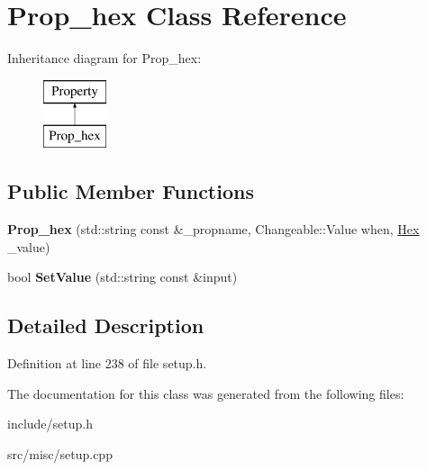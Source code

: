 \hypertarget{classProp__hex}{\section{Prop\-\_\-hex Class Reference}
\label{classProp__hex}
}
Inheritance diagram for Prop\-\_\-hex\-:\begin{figure}[H]
\begin{center}
\leavevmode
\includegraphics[height=2.000000cm]{classProp__hex}
\end{center}
\end{figure}
\subsection*{Public Member Functions}
\begin{DoxyCompactItemize}
\item 
\hypertarget{classProp__hex_a5a9df57c5efae0c495056cda181ccf40}{{\bfseries Prop\-\_\-hex} (std\-::string const \&\-\_\-propname, Changeable\-::\-Value when, \hyperlink{classHex}{Hex} \-\_\-value)}\label{classProp__hex_a5a9df57c5efae0c495056cda181ccf40}

\item 
\hypertarget{classProp__hex_a4ef02f395eda060f696890d61c4abbfd}{bool {\bfseries Set\-Value} (std\-::string const \&input)}\label{classProp__hex_a4ef02f395eda060f696890d61c4abbfd}

\end{DoxyCompactItemize}


\subsection{Detailed Description}


Definition at line 238 of file setup.\-h.



The documentation for this class was generated from the following files\-:\begin{DoxyCompactItemize}
\item 
include/setup.\-h\item 
src/misc/setup.\-cpp\end{DoxyCompactItemize}
